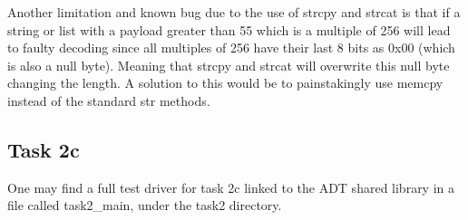 \documentclass[a4paper, 12pt, titlepage]{article}
\begin{document}
\begin{onehalfspacing}
   Another limitation and known bug due to the use of strcpy and strcat is that if a string or list with a payload greater than 55 which is a multiple of 256 will lead to faulty decoding since all multiples of 256 have their last 8 bits as 0x00 (which is also a null byte). Meaning that strcpy and strcat will overwrite this null byte changing the length. A solution to this would be to painstakingly use memcpy instead of the standard str methods.

   \subsection{Task 2c}
   One may find a full test driver for task 2c linked to the ADT shared library in a file called task2\_main, under the task2 directory.



\end{onehalfspacing}
\end{document}
